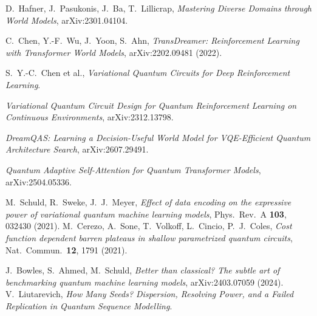 \documentclass[11pt,onecolumn]{article}
\newif\ifdraft
\newcommand{\pend}[1]{%
  \ifdraft\textcolor{PendFG}{\textbf{[}\textit{#1}\textbf{]}}\fi}
\begin{document}

\begin{thebibliography}{9}
 D.~Hafner, J.~Pasukonis, J.~Ba, T.~Lillicrap,
  \emph{Mastering Diverse Domains through World Models},
  arXiv:2301.04104. \pend{venue of record}
 C.~Chen, Y.-F.~Wu, J.~Yoon, S.~Ahn,
  \emph{TransDreamer: Reinforcement Learning with Transformer World
  Models}, arXiv:2202.09481 (2022). \pend{verify author list}
 S.~Y.-C.~Chen et al., \emph{Variational Quantum
  Circuits for Deep Reinforcement Learning}. \pend{full citation}
 \emph{Variational Quantum Circuit Design for
  Quantum Reinforcement Learning on Continuous Environments},
  arXiv:2312.13798. \pend{verify authors}
 \emph{DreamQAS: Learning a Decision-Useful World
  Model for VQE-Efficient Quantum Architecture Search},
  arXiv:2607.29491. \pend{verify authors}
 \emph{Quantum Adaptive Self-Attention for Quantum
  Transformer Models}, arXiv:2504.05336. \pend{verify authors; cite the
  revised version}
 M.~Schuld, R.~Sweke, J.~J.~Meyer, \emph{Effect of
  data encoding on the expressive power of variational quantum machine
  learning models}, Phys.\ Rev.\ A \textbf{103}, 032430 (2021).
 M.~Cerezo, A.~Sone, T.~Volkoff, L.~Cincio,
  P.~J.~Coles, \emph{Cost function dependent barren plateaus in shallow
  parametrized quantum circuits}, Nat.\ Commun.\ \textbf{12}, 1791
  (2021). \pend{verify}
 J.~Bowles, S.~Ahmed, M.~Schuld, \emph{Better than
  classical? The subtle art of benchmarking quantum machine learning
  models}, arXiv:2403.07059 (2024).
 V.~Liutarevich, \emph{How Many Seeds? Dispersion,
  Resolving Power, and a Failed Replication in Quantum Sequence
  Modelling}. \pend{companion paper}
\end{thebibliography}
\end{document}
